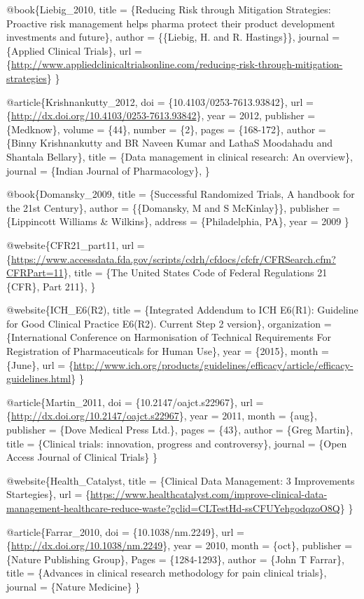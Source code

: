 \documentclass[]{book}
\theoremstyle{definition}
\theoremstyle{definition}
\theoremstyle{definition}
\theoremstyle{remark}
\begin{document}
@book\{Liebig\_2010, title = \{Reducing Risk through Mitigation
Strategies: Proactive risk management helps pharma protect their product
development investments and future\}, author = \{\{Liebig, H. and R.
Hastings\}\}, journal = \{Applied Clinical Trials\}, url =
\{\url{http://www.appliedclinicaltrialsonline.com/reducing-risk-through-mitigation-strategies}\}
\}

@article\{Krishnankutty\_2012, doi = \{10.4103/0253-7613.93842\}, url =
\{\url{http://dx.doi.org/10.4103/0253-7613.93842}\}, year = 2012,
publisher = \{Medknow\}, volume = \{44\}, number = \{2\}, pages =
\{168-172\}, author = \{Binny Krishnankutty and BR Naveen Kumar and
LathaS Moodahadu and Shantala Bellary\}, title = \{Data management in
clinical research: An overview\}, journal = \{Indian Journal of
Pharmacology\}, \}

@book\{Domansky\_2009, title = \{Successful Randomized Trials, A
handbook for the 21st Century\}, author = \{\{Domansky, M and S
McKinlay\}\}, publisher = \{Lippincott Williams \& Wilkins\}, address =
\{Philadelphia, PA\}, year = 2009 \}

@website\{CFR21\_part11, url =
\{\url{https://www.accessdata.fda.gov/scripts/cdrh/cfdocs/cfcfr/CFRSearch.cfm?CFRPart=11}\},
title = \{The United States Code of Federal Regulations 21 \{CFR\}, Part
211\}, \}

@website\{ICH\_E6(R2), title = \{Integrated Addendum to ICH E6(R1):
Guideline for Good Clinical Practice E6(R2). Current Step 2 version\},
organization = \{International Conference on Harmonisation of Technical
Requirements For Registration of Pharmaceuticals for Human Use\}, year =
\{2015\}, month = \{June\}, url =
\{\url{http://www.ich.org/products/guidelines/efficacy/article/efficacy-guidelines.html}\}
\}

@article\{Martin\_2011, doi = \{10.2147/oajct.s22967\}, url =
\{\url{http://dx.doi.org/10.2147/oajct.s22967}\}, year = 2011, month =
\{aug\}, publisher = \{Dove Medical Press Ltd.\}, pages = \{43\}, author
= \{Greg Martin\}, title = \{Clinical trials: innovation, progress and
controversy\}, journal = \{Open Access Journal of Clinical Trials\} \}

@website\{Health\_Catalyst, title = \{Clinical Data Management: 3
Improvements Startegies\}, url =
\{\url{https://www.healthcatalyst.com/improve-clinical-data-management-healthcare-reduce-waste?gclid=CLTestHd-ssCFUYehgodqzoO8Q}\}
\}

@article\{Farrar\_2010, doi = \{10.1038/nm.2249\}, url =
\{\url{http://dx.doi.org/10.1038/nm.2249}\}, year = 2010, month =
\{oct\}, publisher = \{Nature Publishing Group\}, Pages = \{1284-1293\},
author = \{John T Farrar\}, title = \{Advances in clinical research
methodology for pain clinical trials\}, journal = \{Nature Medicine\} \}
\end{document}
